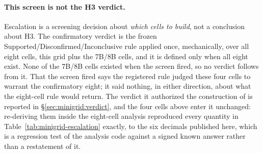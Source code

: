 \paragraph{This screen is not the H3 verdict.}
Escalation is a screening decision about \emph{which cells to build}, not a
conclusion about H3. The confirmatory verdict is the frozen
Supported/Disconfirmed/Inconclusive rule applied once, mechanically, over all
eight cells, this grid plus the 7B/8B cells, and it is defined only when all
eight exist. None of the 7B/8B cells existed when the screen fired, so no verdict
follows from it. That the screen fired says the registered rule judged these four
cells to warrant the confirmatory eight; it said nothing, in either direction,
about what the eight-cell rule would return. The verdict it authorized the
construction of is reported in \S\ref{sec:minigrid:verdict}, and the four cells
above enter it unchanged: re-deriving them inside the eight-cell analysis
reproduced every quantity in Table~\ref{tab:minigrid-escalation} exactly, to the
six decimals published here, which is a regression test of the analysis code
against a signed known answer rather than a restatement of it.
